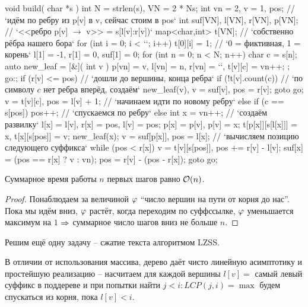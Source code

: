 \begin{code}
void build( char *s ) {
	int N = strlen(s), VN = 2 * Ns;
	int vn = 2, v = 1, pos; // `идём по ребру из p[v] в v, сейчас стоим в pos`
	int suf[VN], l[VN], r[VN], p[VN]; // `<<ребро p[v] $\to$ v>> = s[l[v]:r[v])`
	map<char,int> t[VN]; // `собственно рёбра нашего бора`
	for (int i = 0; i < `\blue{$|\Sigma|$}`; i++) t[0][i] = 1; // `0 = фиктивная, 1 = корень`
	l[1] = -1, r[1] = 0, suf[1] = 0;
	for (int n = 0; n < N; n++) {
		char c = s[n];
		auto new_leaf = [&]( int v ) {
			p[vn] = v, l[vn] = n, r[vn] = `\blue{$\infty$}`, t[v][c] = vn++;
		};
		go:;
		if (r[v] <= pos) { // `дошли до вершины, конца ребра`
			if (!t[v].count(c)) { // `по символу $c$ нет ребра вперёд, создаём`
				new_leaf(v), v = suf[v], pos = r[v];
				goto go;
			}
			v = t[v][c], pos = l[v] + 1; // `начинаем идти по новому ребру`
		} else if (c == s[pos]) {
			pos++; // `спускаемся по ребру`
		} else {
			int x = vn++; // `создаём развилку`
			l[x] = l[v], r[x] = pos, l[v] = pos;
			p[x] = p[v], p[v] = x;
			t[p[x]][s[l[x]]] = x, t[x][s[pos]] = v;
			new_leaf(x);
			v = suf[p[x]], pos = l[x]; // `вычисляем позицию следующего суффикса`
			while (pos < r[x])
				v = t[v][s[pos]], pos += r[v] - l[v];
			suf[x] = (pos == r[x] ? v : vn);
			pos = r[v] - (pos - r[x]);
			goto go;
		}
	}
}
\end{code}

\pagebreak
\vspace*{-1.5em}
\begin{Thm}
Суммарное время работы $n$ первых шагов равно $\mathcal{O}(n)$.
\end{Thm}
\begin{proof}
Понаблюдаем за величиной $\varphi$ ``число вершин на пути от корня до нас''.\\
Пока мы идём вниз, $\varphi$ растёт, когда переходим по суффссылке, $\varphi$ уменьшается максимум на $1$
$\Rightarrow$ суммарное число шагов вниз не больше $n$.
\end{proof}

\up
{}

Решим ещё одну задачу -- сжатие текста алгоритмом LZSS.

В отличии от использования массива, дерево даёт чисто линейную асимптотику и простейшую реализацию --
насчитаем для каждой вершины $l[v] =$ самый левый суффикс в поддереве и при попытки найти $j < i \colon LCP(j, i) = \max$ будем
спускаться из корня, пока $l[v] < i$.
